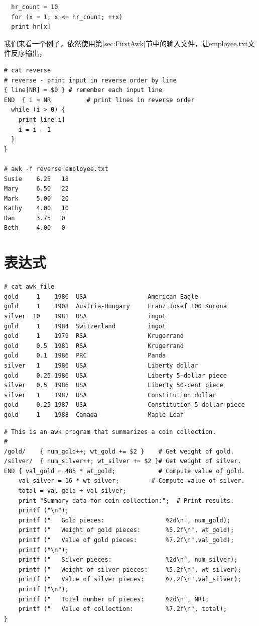 \begin{verbatim}
  hr_count = 10
  for (x = 1; x <= hr_count; ++x)
  print hr[x]
\end{verbatim}

我们来看一个例子，依然使用第\ref{sec:FirstAwk}节中的输入文件，让employee.txt文件反序输出，

\begin{verbatim}
# cat reverse
# reverse - print input in reverse order by line
{ line[NR] = $0 } # remember each input line
END  { i = NR          # print lines in reverse order
  while (i > 0) {
    print line[i]
    i = i - 1
  }
}
  
# awk -f reverse employee.txt
Susie    6.25   18
Mary     6.50   22
Mark     5.00   20
Kathy    4.00   10
Dan      3.75   0
Beth     4.00   0
\end{verbatim}

\section{表达式}

\begin{verbatim}
# cat awk_file 
gold     1    1986  USA                 American Eagle
gold     1    1908  Austria-Hungary     Franz Josef 100 Korona
silver  10    1981  USA                 ingot
gold     1    1984  Switzerland         ingot
gold     1    1979  RSA                 Krugerrand
gold     0.5  1981  RSA                 Krugerrand
gold     0.1  1986  PRC                 Panda
silver   1    1986  USA                 Liberty dollar
gold     0.25 1986  USA                 Liberty 5-dollar piece
silver   0.5  1986  USA                 Liberty 50-cent piece
silver   1    1987  USA                 Constitution dollar
gold     0.25 1987  USA                 Constitution 5-dollar piece
gold     1    1988  Canada              Maple Leaf
\end{verbatim}

\begin{verbatim}
# This is an awk program that summarizes a coin collection.
#
/gold/    { num_gold++; wt_gold += $2 }    # Get weight of gold.
/silver/  { num_silver++; wt_silver += $2 }# Get weight of silver.
END { val_gold = 485 * wt_gold;            # Compute value of gold.
    val_silver = 16 * wt_silver;         # Compute value of silver.
    total = val_gold + val_silver;
    print "Summary data for coin collection:";  # Print results.
    printf ("\n");
    printf ("   Gold pieces:                 %2d\n", num_gold);
    printf ("   Weight of gold pieces:       %5.2f\n", wt_gold);
    printf ("   Value of gold pieces:        %7.2f\n",val_gold);
    printf ("\n");
    printf ("   Silver pieces:               %2d\n", num_silver);
    printf ("   Weight of silver pieces:     %5.2f\n", wt_silver);
    printf ("   Value of silver pieces:      %7.2f\n",val_silver);
    printf ("\n");
    printf ("   Total number of pieces:      %2d\n", NR);
    printf ("   Value of collection:         %7.2f\n", total);
}
\end{verbatim}


